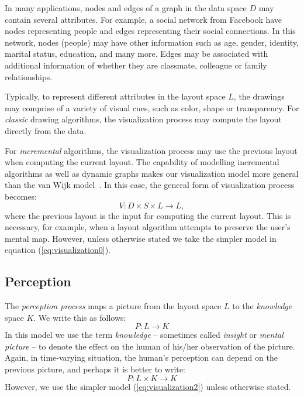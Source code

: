 \documentclass[10pt,journal,cspaper,compsoc]{IEEEtran}
\begin{document}
In many applications, nodes and edges of a graph in the data space $D$ may contain several attributes. For example, a social network from Facebook have nodes representing people and edges representing their social connections. In this network, nodes (people) may have other information such as age, gender, identity, marital status, education, and many more. Edges may be associated with additional information of whether they are classmate, colleague or family relationships.

Typically, to represent different attributes in the layout space $L$, the drawings may comprise of a variety of visual cues, such as color, shape or transparency. For \emph{classic} drawing algorithms, the visualization process may compute the layout directly from the data.


For \emph{incremental} algorithms, the visualization process may use the
previous layout when computing the current layout.
The capability of modelling incremental algorithms as well as dynamic graphs makes
our visualization model more general than the van Wijk model~\cite{van2005value}.
In this case,
the general form of visualization process becomes:
\begin{equation*}
\label{eq:visualization1}
V : D \times S \times L \rightarrow L ,
\end{equation*}
where the previous layout is the input for computing the current layout.
This is necessary, for example, when a layout algorithm attempts to
preserve the user's mental map. However, unless otherwise stated we take the simpler model in equation (\ref{eq:visualization0}).

\subsection{Perception}
The \emph{perception process} maps a picture from the layout space
$L$ to the \emph{knowledge} space $K$. We write this as
follows:
\begin{equation}
\label{eq:visualization2}
P : L \rightarrow K
\end{equation}
In this model we use the term {\em knowledge} -- sometimes called
\emph{insight} or \emph{mental picture} -- to denote the effect on the
human of his/her observation of the picture. Again, in time-varying
situation, the human's perception can depend on the previous picture,
and perhaps it is better to write:
\begin{equation*}
P : L \times K \rightarrow K
\end{equation*}
However, we use the simpler model (\ref{eq:visualization2}) unless otherwise stated.
\end{document}
